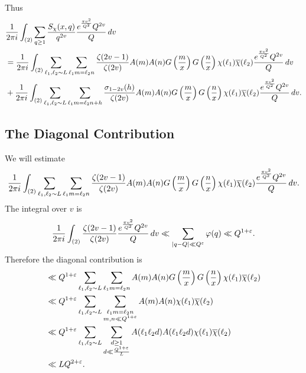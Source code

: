 \documentclass[12pt,reqno,oneside]{amsart}
\begin{document}
    Thus
    \begin{align*}
      &\frac{1}{2\pi i}\int_{(2)}\sum_{q \ge 1}\frac{S_{\chi}(x,q)}{q^{2v}}\frac{e^{\frac{\pi v^{2}}{Q^{2}}}Q^{2v}}{Q}\,dv \\
      &= \frac{1}{2\pi i}\int_{(2)}\sum_{\ell_{1},\ell_{2} \sim L}\sum_{\ell_{1}m = \ell_{2}n}\frac{\zeta(2v-1)}{\zeta(2v)}A(m)A(n)G\left(\frac{m}{x}\right)G\left(\frac{n}{x}\right)\chi(\ell_{1})\overline{\chi}(\ell_{2})\frac{e^{\frac{\pi v^{2}}{Q^{2}}}Q^{2v}}{Q}\,dv \\
      &+\frac{1}{2\pi i}\int_{(2)}\sum_{\ell_{1},\ell_{2} \sim L}\sum_{\ell_{1}m = \ell_{2}n+h}\frac{\sigma_{1-2v}(h)}{\zeta(2v)}A(m)A(n)G\left(\frac{m}{x}\right)G\left(\frac{n}{x}\right)\chi(\ell_{1})\overline{\chi}(\ell_{2})\frac{e^{\frac{\pi v^{2}}{Q^{2}}}Q^{2v}}{Q}\,dv.
    \end{align*}
  \subsection*{The Diagonal Contribution}
    We will estimate
    \[
      \frac{1}{2\pi i}\int_{(2)}\sum_{\ell_{1},\ell_{2} \sim L}\sum_{\ell_{1}m = \ell_{2}n}\frac{\zeta(2v-1)}{\zeta(2v)}A(m)A(n)G\left(\frac{m}{x}\right)G\left(\frac{n}{x}\right)\chi(\ell_{1})\overline{\chi}(\ell_{2})\frac{e^{\frac{\pi v^{2}}{Q^{2}}}Q^{2v}}{Q}\,dv.
    \]
    The integral over $v$ is
    \[
      \frac{1}{2\pi i}\int_{(2)}\frac{\zeta(2v-1)}{\zeta(2v)}\frac{e^{\frac{\pi v^{2}}{Q^{2}}}Q^{2v}}{Q}\,dv \ll \sum_{|q-Q| \ll Q^{\varepsilon}}\varphi(q) \ll Q^{1+\varepsilon}.
    \]
    Therefore the diagonal contribution is
    \begin{align*}
      &\ll Q^{1+\varepsilon}\sum_{\ell_{1},\ell_{2} \sim L}\sum_{\ell_{1}m = \ell_{2}n}A(m)A(n)G\left(\frac{m}{x}\right)G\left(\frac{n}{x}\right)\chi(\ell_{1})\overline{\chi}(\ell_{2}) \\
      &\ll Q^{1+\varepsilon}\sum_{\ell_{1},\ell_{2} \sim L}\sum_{\substack{\ell_{1}m = \ell_{2}n \\ m,n \ll Q^{1+\varepsilon}}}A(m)A(n)\chi(\ell_{1})\overline{\chi}(\ell_{2}) \\
      &\ll Q^{1+\varepsilon}\sum_{\ell_{1},\ell_{2} \sim L}\sum_{\substack{d \ge 1 \\ d \ll \frac{Q^{1+\varepsilon}}{L}}}A(\ell_{1}\ell_{2}d)A(\ell_{1}\ell_{2}d)\chi(\ell_{1})\overline{\chi}(\ell_{2}) \\
      &\ll LQ^{2+\varepsilon}.
    \end{align*}
\end{document}
